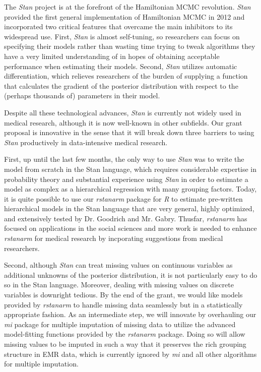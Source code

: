 \documentclass[11pt,notitlepage]{article}
\begin{document}
The \textit{Stan} project is at the forefront of the Hamiltonian MCMC revolution.
\textit{Stan} provided the first general implementation of Hamiltonian MCMC in 2012 and
incorporated two critical features that overcame the main inhibitors to its widespread
use. First, \textit{Stan} is almost self-tuning, so
researchers can focus on specifying their models rather than wasting time trying to
tweak algorithms they have a very limited understanding of in hopes of obtaining 
acceptable performance when estimating their models. Second, \textit{Stan} utilizes
automatic differentiation, which relieves researchers of the burden of supplying
a function that calculates the gradient of the posterior distribution with respect
to the (perhaps thousands of) parameters in their model.

Despite all these technological advances, \textit{Stan} is currently not widely used
in medical research, although it is now well-known in other subfields. Our grant
proposal is innovative in the sense that it will break down three barriers to using
\textit{Stan} productively in data-intensive medical research. 

First, up until the last few months, the only way to use \textit{Stan} was to write the 
model from scratch in the Stan language, which requires considerable expertise in 
probability theory and substantial experience using \textit{Stan} in order to estimate
a model as complex as a hierarchical regression with many grouping factors. Today, it
is quite possible to use our \textit{rstanarm} package for \textit{R} to estimate
pre-written hierarchical models in the Stan language that are very general, highly
optimized, and extensively tested by Dr. Goodrich and Mr. Gabry. Thusfar, \textit{rstanarm}
has focused on applications in the social sciences and more work is needed to enhance
\textit{rstanarm} for medical research by incporating suggestions from medical researchers.

Second, although \textit{Stan} can treat missing values on continuous variables as 
additional unknowns of the posterior distribution, it is not particularly easy to do so
in the Stan language. Moreover, dealing with missing values on discrete variables is
downright tedious. By the end of the grant, we would like models provided by 
\textit{rstanarm} to handle missing data seamlessly but in a statistically appropriate
fashion. As an intermediate step, we will innovate by overhauling our \textit{mi}
package for multiple imputation of missing data to utilize the advanced model-fitting
functions provided by the \textit{rstanarm} package. Doing so will allow missing values
to be imputed in such a way that it preserves the rich grouping structure in EMR data, 
which is currently ignored by \textit{mi} and all other algorithms for multiple imputation.
\end{document}
